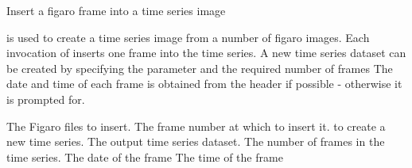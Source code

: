 \begin{manroutinedescription}
        Insert a figaro frame into a time series image

        {} is used to create a time series image from a number
        of figaro images. Each invocation of {} inserts one frame
        into the time series. A new time series dataset can be created
        by specifying the {} parameter and the required number of %
frames
        The date and time of each frame is obtained from the {} %
header
        if possible - otherwise it is prompted for.

\begin{manparametertable}
     The Figaro files to insert.
  The frame number at which to %
insert it.
  {} to create a new %
time series.
  The %
output time series dataset.
  The number of frames in the %
time series.
     The {} date of the %
frame
     The {} time of the frame

\end{manparametertable}
\end{manroutinedescription}
